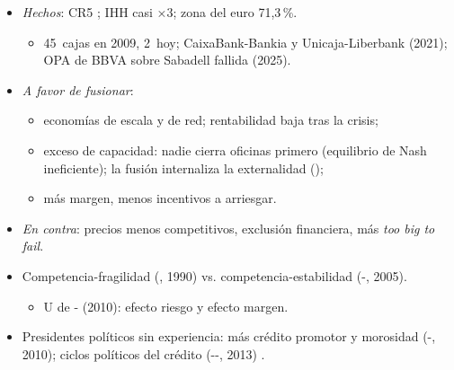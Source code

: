 \documentclass{article}
\begin{document}
\begin{columnas}
\begin{itemize}
\item \emph{Hechos}: CR5 ; IHH casi ×3; zona del euro 71,3\,\%.
  \begin{itemize}
  \item 45~cajas en 2009, 2~hoy; CaixaBank-Bankia y Unicaja-Liberbank (2021); OPA de BBVA sobre Sabadell fallida (2025).
  \end{itemize}
\item \emph{A favor de fusionar}:
  \begin{itemize}
  \item economías de escala y de red; rentabilidad baja tras la crisis;
  \item exceso de capacidad: nadie cierra oficinas primero (equilibrio de Nash ineficiente); la fusión internaliza la externalidad ();
  \item más margen, menos incentivos a arriesgar.
  \end{itemize}
\item \emph{En contra}: precios menos competitivos, exclusión financiera, más \emph{too big to fail}.
\item Competencia-fragilidad (, 1990) vs. competencia-estabilidad (-, 2005).
  \begin{itemize}
  \item U de - (2010): efecto riesgo y efecto margen.
  \end{itemize}
\end{itemize}
\begin{itemize}
\item Presidentes políticos sin experiencia: más crédito promotor y morosidad (-, 2010); ciclos políticos del crédito (--, 2013) .
\end{itemize}


\end{columnas}
\end{document}
